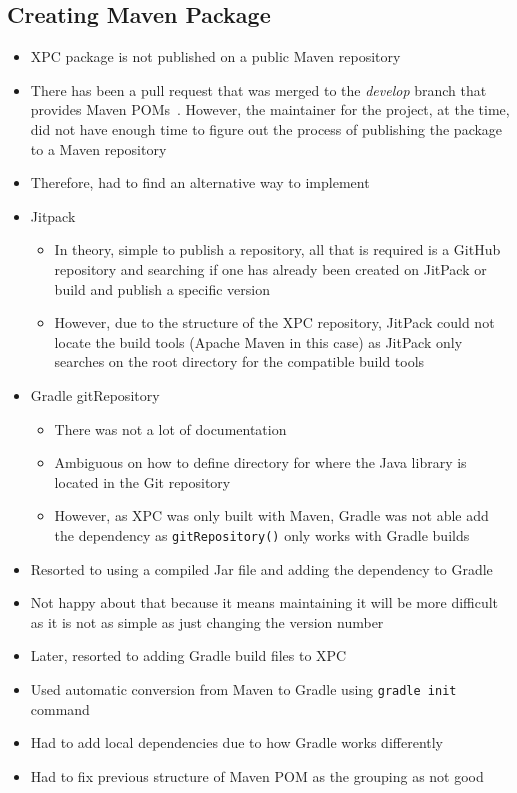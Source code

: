 \documentclass[../dissertation.tex]{subfiles}
\begin{document}
\subsection{Creating Maven Package}
\begin{itemize}
  \item XPC package is not published on a public Maven repository
  \item There has been a pull request that was merged to the \textit{develop} branch
    that provides Maven POMs~\cite{xpc:pom}. However, the maintainer for the
    project, at the time, did not have enough time to figure out the process of
    publishing the package to a Maven repository~\cite{xpc:pom-time}
  \item Therefore, had to find an alternative way to implement
  \item Jitpack~\cite{jitpack}
  \begin{itemize}
    \item In theory, simple to publish a repository, all that is required is a GitHub
      repository and searching if one has already been created on JitPack or build and publish
      a specific version
    \item However, due to the structure of the XPC repository, JitPack could not locate the
      build tools (Apache Maven in this case) as JitPack only searches on the root directory
      for the compatible build tools
  \end{itemize}
  \item Gradle gitRepository~\cite{gradle:gitRepository}
  \begin{itemize}
    \item There was not a lot of documentation
    \item Ambiguous on how to define directory for where the Java library is located in the Git repository
    \item However, as XPC was only built with Maven, Gradle was not able add the dependency as \lstinline|gitRepository()|
      only works with Gradle builds~\cite{gradle:gitRepoGradleOnly}
  \end{itemize}
\item Resorted to using a compiled Jar file and adding the dependency to Gradle
\item Not happy about that because it means maintaining it will be more difficult as
  it is not as simple as just changing the version number
\item Later, resorted to adding Gradle build files to XPC
\item Used automatic conversion from Maven to Gradle using \lstinline|gradle init| command~\cite{gradle:migratePOM}
\item Had to add local dependencies due to how Gradle works differently
\item Had to fix previous structure of Maven POM as the grouping as not good
\end{itemize}
\end{document}
